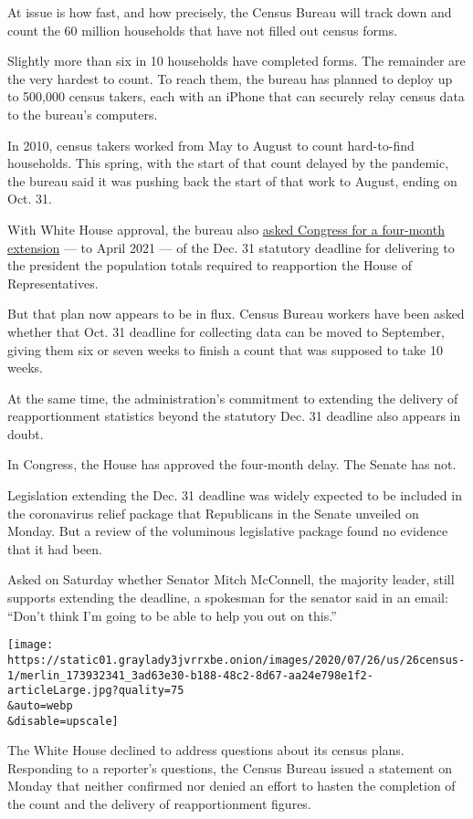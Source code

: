 At issue is how fast, and how precisely, the Census Bureau will track
down and count the 60 million households that have not filled out census
forms.

Slightly more than six in 10 households have completed forms. The
remainder are the very hardest to count. To reach them, the bureau has
planned to deploy up to 500,000 census takers, each with an iPhone that
can securely relay census data to the bureau's computers.

In 2010, census takers worked from May to August to count hard-to-find
households. This spring, with the start of that count delayed by the
pandemic, the bureau said it was pushing back the start of that work to
August, ending on Oct. 31.

With White House approval, the bureau also
\href{https://www.nytimes3xbfgragh.onion/2020/04/13/us/census-coronavirus-delay.html?searchResultPosition=9}{asked
Congress for a four-month extension} --- to April 2021 --- of the Dec.
31 statutory deadline for delivering to the president the population
totals required to reapportion the House of Representatives.

But that plan now appears to be in flux. Census Bureau workers have been
asked whether that Oct. 31 deadline for collecting data can be moved to
September, giving them six or seven weeks to finish a count that was
supposed to take 10 weeks.

At the same time, the administration's commitment to extending the
delivery of reapportionment statistics beyond the statutory Dec. 31
deadline also appears in doubt.

In Congress, the House has approved the four-month delay. The Senate has
not.

Legislation extending the Dec. 31 deadline was widely expected to be
included in the coronavirus relief package that Republicans in the
Senate unveiled on Monday. But a review of the voluminous legislative
package found no evidence that it had been.

Asked on Saturday whether Senator Mitch McConnell, the majority leader,
still supports extending the deadline, a spokesman for the senator said
in an email: ``Don't think I'm going to be able to help you out on
this.''

\texttt{[image: https://static01.graylady3jvrrxbe.onion/images/2020/07/26/us/26census-1/merlin\_173932341\_3ad63e30-b188-48c2-8d67-aa24e798e1f2-articleLarge.jpg?quality=75\\\&auto=webp\\\&disable=upscale]}

The White House declined to address questions about its census plans.
Responding to a reporter's questions, the Census Bureau issued a
statement on Monday that neither confirmed nor denied an effort to
hasten the completion of the count and the delivery of reapportionment
figures.

